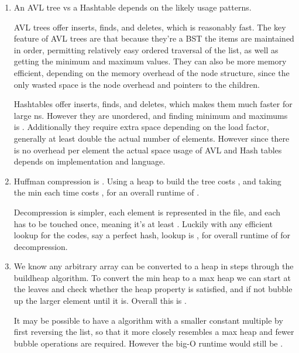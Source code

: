 \documentclass[12pt]{chmullighw}
\begin{document}
\begin{enumerate}
\item An AVL tree vs a Hashtable depends on the likely usage patterns.

AVL trees offer  inserts, finds, and deletes, which is reasonably
fast. The key feature of AVL trees are that because they're a BST the items are
maintained in order, permitting relatively easy ordered traversal of the list,
as well as getting the minimum and maximum values. They can also be more memory
efficient, depending on the memory overhead of the node structure, since the
only wasted space is the node overhead and pointers to the children.

Hashtables offer  inserts, finds, and deletes, which makes them much
faster for large ns. However they are unordered, and finding minimum and
maximums is . Additionally they require extra space depending on the
load factor, generally at least double the actual number of elements. However
since there is no overhead per element the actual space usage of AVL and Hash
tables depends on implementation and language.

\item Huffman compression is . Using a heap to build the tree
costs , and taking the min each time costs , for an overall
runtime of .

Decompression is simpler, each element is represented in the file, and each has
to be touched once, meaning it's at least . Luckily with any efficient
lookup for the codes, say a perfect hash, lookup is , for overall
runtime of  for decompression.

\item We know any arbitrary array can be converted to a heap in  steps
through the buildheap algorithm. To convert the min heap to a max heap we can
start at the leaves and check whether the heap property is satisfied, and if not
bubble up the larger element until it is. Overall this is . 

It may be possible to have a  algorithm with a smaller constant multiple
by first reversing the list, so that it more closely resembles a max heap and
fewer bubble operations are required. However the big-O runtime would still be
.

\end{enumerate} %
\end{document}
